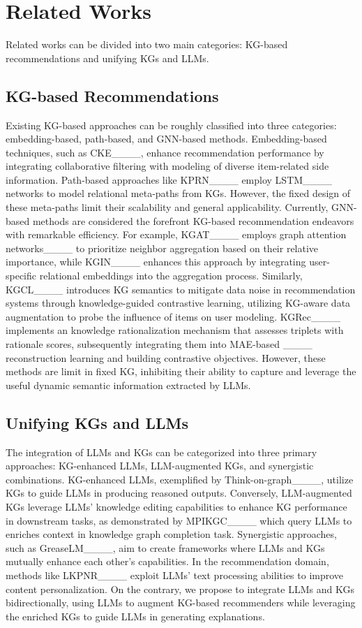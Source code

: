 \section{Related Works}
Related works can be divided into two main categories: KG-based recommendations and unifying KGs and LLMs.

\subsection{KG-based Recommendations}
Existing KG-based approaches can be roughly classified into three categories: embedding-based, path-based, and GNN-based methods. 
Embedding-based techniques, such as CKE____, enhance recommendation performance by integrating collaborative filtering with modeling of diverse item-related side information.
Path-based approaches like KPRN____ employ LSTM____ networks to model relational meta-paths from KGs. However, the fixed design of these meta-paths limit their scalability and general applicability.
Currently, GNN-based methods are considered the forefront KG-based recommendation endeavors with remarkable efficiency. For example, KGAT____ employs graph attention networks____ to prioritize neighbor aggregation based on their relative importance, while KGIN____ enhances this approach by integrating user-specific relational embeddings into the aggregation process. Similarly, KGCL____ introduces KG semantics to mitigate data noise in recommendation systems through knowledge-guided contrastive learning, utilizing KG-aware data augmentation to probe the influence of items on user modeling. KGRec____ implements an knowledge rationalization mechanism that assesses triplets with rationale scores, subsequently integrating them into MAE-based ____ reconstruction learning and building contrastive objectives. However, these methods are limit in fixed KG, inhibiting their ability to capture and leverage the useful dynamic semantic information extracted by LLMs.

\vspace{-0.2cm}\subsection{Unifying KGs and LLMs} 
The integration of LLMs and KGs can be categorized into three primary approaches: KG-enhanced LLMs, LLM-augmented KGs, and synergistic combinations. 
KG-enhanced LLMs, exemplified by Think-on-graph____, utilize KGs to guide LLMs in producing reasoned outputs. Conversely, LLM-augmented KGs leverage LLMs' knowledge editing capabilities to enhance KG performance in downstream tasks, as demonstrated by MPIKGC____ which query LLMs to enriches context in knowledge graph completion task. 
Synergistic approaches, such as GreaseLM____, aim to create frameworks where LLMs and KGs mutually enhance each other's capabilities. In the recommendation domain, methods like LKPNR____ exploit LLMs' text processing abilities to improve content personalization. On the contrary, we propose to integrate LLMs and KGs bidirectionally, using LLMs to augment KG-based recommenders while leveraging the enriched KGs to guide LLMs in generating explanations.


